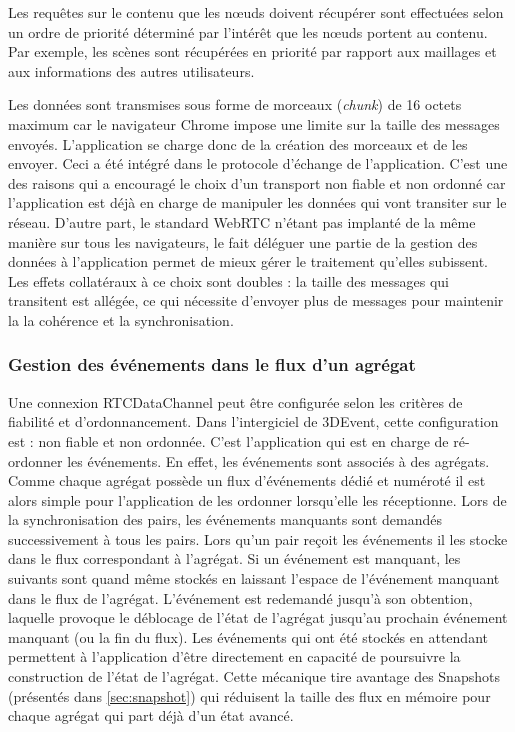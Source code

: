 Les requêtes sur le contenu que les n\oe uds doivent récupérer sont effectuées selon 
un ordre de priorité déterminé par l'intérêt que les n\oe uds portent au contenu. Par exemple, 
les scènes sont récupérées en priorité par rapport aux maillages et aux 
informations des autres utilisateurs. 

Les données sont transmises sous forme de morceaux (\textit{chunk}) de 16 
octets maximum car le navigateur Chrome impose une limite sur la taille des messages 
envoyés. L'application se charge donc de la création des morceaux et de les 
envoyer. Ceci a été intégré dans le protocole d'échange de l'application. C'est une 
des raisons qui a encouragé le choix d'un transport non fiable et non ordonné car 
l'application est déjà en charge de manipuler les données qui vont transiter sur le 
réseau. D'autre part, le standard WebRTC n'étant pas implanté de la même 
manière sur tous les navigateurs, le fait déléguer une partie de la gestion des 
données à l'application permet de mieux gérer le traitement qu'elles subissent. Les 
effets collatéraux à ce choix sont doubles : la taille des messages qui transitent 
est allégée, ce qui nécessite d'envoyer plus de messages pour maintenir la 
 la cohérence et la synchronisation.


\subsubsection{Gestion des événements dans le flux d'un agrégat}

Une connexion RTCDataChannel peut être configurée selon 
les critères de fiabilité et d'ordonnancement. 
Dans l'intergiciel de 3DEvent, cette configuration est : non fiable et non ordonnée. 
C'est l'application qui est en charge de \og ré-ordonner\fg{} les événements. En 
effet, les événements sont associés à des agrégats. Comme chaque agrégat 
possède un flux d'événements dédié et numéroté il est alors simple pour 
l'application de les 
ordonner lorsqu'elle les réceptionne. 
Lors de la synchronisation des pairs, les 
événements manquants sont demandés successivement à tous les pairs. Lors 
qu'un pair reçoit les événements il les stocke dans le flux correspondant à 
l'agrégat. Si un événement est manquant, les suivants sont quand même stockés 
en laissant l'espace de l'événement manquant dans le flux de l'agrégat. L'événement est 
redemandé jusqu'à son obtention, laquelle provoque le déblocage de l'état de 
l'agrégat jusqu'au prochain événement manquant (ou la fin du flux). Les 
événements qui ont été stockés \og en attendant\fg{} permettent à l'application 
d'être directement en capacité de poursuivre la construction de l'état de l'agrégat. 
Cette mécanique tire avantage des Snapshots (présentés dans \ref{sec:snapshot}) 
qui réduisent la taille des flux en mémoire pour chaque agrégat qui part déjà d'un 
état avancé.


